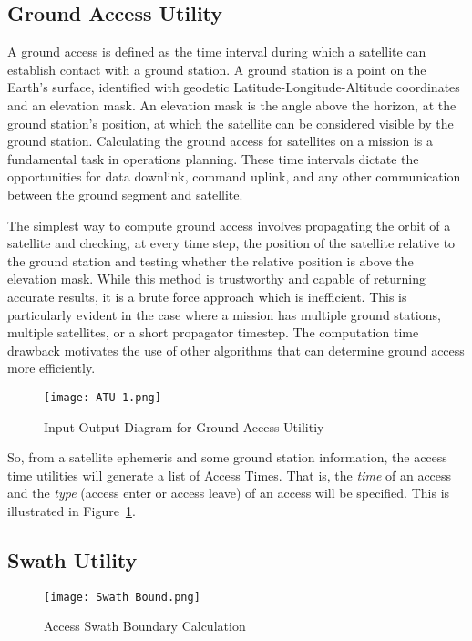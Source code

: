 \subsection{Ground Access Utility}

A ground access is defined as the time interval during which a satellite can
establish contact with a ground station. A ground station is a point on the
Earth’s surface, identified with geodetic Latitude-Longitude-Altitude
coordinates and an elevation mask. An elevation mask is the angle above the
horizon, at the ground station’s position, at which the satellite can be
considered visible by the ground station. Calculating the ground access for
satellites on a mission is a fundamental task in operations planning. These
time intervals dictate the opportunities for data downlink, command uplink, and
any other communication between the ground segment and satellite.

The simplest way to compute ground access involves propagating the orbit of a
satellite and checking, at every time step, the position of the satellite
relative to the ground station and testing whether the relative position is
above the elevation mask. While this method is trustworthy and capable of
returning accurate results, it is a brute force approach which is inefficient.
This is particularly evident in the case where a mission has multiple ground
stations, multiple satellites, or a short propagator timestep. The computation
time drawback motivates the use of other algorithms that can determine ground
access more efficiently.

\begin{figure}[h]
    \centering
    \texttt{[image: ATU-1.png]} 
    \caption{Input Output Diagram for Ground Access Utilitiy}
    \label{fig:atu-1} 
\end{figure}

So, from a satellite ephemeris and some ground station information, the access
time utilities will generate a list of Access Times. That is, the \textit{time}
of an access and the \textit{type} (access enter or access leave) of an access
will be specified. This is illustrated in Figure~\ref{fig:atu-1}.

\subsection {Swath Utility}

\begin{figure}
    \centering
    \texttt{[image: Swath Bound.png]} 
    \caption{Access Swath Boundary Calculation}
    \label{fig:swath-bound} 
\end{figure}

